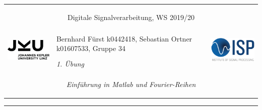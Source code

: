 \documentclass[12pt,a4paper,austrian]{article}
\begin{document}
\pagestyle{plain}
  \thispagestyle{empty}
  \noindent
  \begin{minipage}[b][2.4cm]{1.0\textwidth}  
  \begin{tabular}{l p{11cm} r} 
    \multicolumn{3}{c}{\centering \begin{large}\begin{bf}
  	\textsf{Digitale Signalverarbeitung, WS 2019/20} \end{bf}\end{large} }  
  	 \\
  	\multirow{2}{*}{\includegraphics[height=1.6cm]{fig/JKU_Logo}} 
  	& \centering Bernhard Fürst k0442418, Sebastian Ortner k01607533, Gruppe 34 \vspace{1.3em}  &
    \multirow{2}{*}{\includegraphics[height=1.9cm]{fig/ISP-Logo-color-02}}  \\	
    & \centering \textit{1. Übung} & \\     
    \multicolumn{3}{c}{\centering \begin{large}
    \textit{Einführung in Matlab und Fourier-Reihen}%
    \end{large} }  
 
  \end{tabular} 
  \end{minipage}

  \noindent \rule[0.8em]{\textwidth}{0.12mm}\\[-0.5em]

\end{document}
